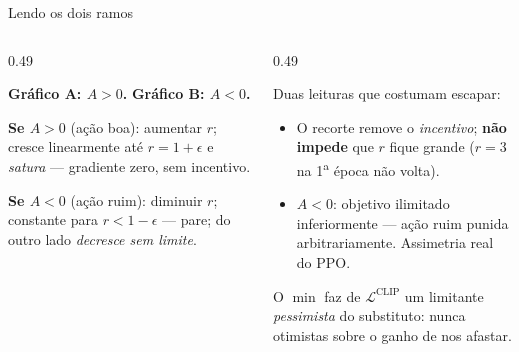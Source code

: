 \documentclass[aspectratio=169, 10pt]{beamer}
\newcommand{\Adv}{A}
\newcommand{\Lclip}{\mathcal{L}^{\mathrm{CLIP}}}
\begin{document}
\begin{frame}{Lendo os dois ramos}

  \begin{columns}[T]
  \begin{column}{0.49\textwidth}
    \begin{respbox}
      \textbf{Gráfico A: $\Adv>0$.} \; \textbf{Gráfico B: $\Adv<0$.}
    \end{respbox}
    \smallskip
    {\small
    \textbf{Se $\Adv>0$} (ação boa): aumentar $r$; cresce linearmente até
    $r = 1+\epsilon$ e \emph{satura} --- gradiente zero, sem incentivo.
    \par\smallskip
    \textbf{Se $\Adv<0$} (ação ruim): diminuir $r$; constante para
    $r < 1-\epsilon$ --- pare; do outro lado \emph{decresce sem limite}.}
  \end{column}
  \begin{column}{0.49\textwidth}
    \begin{alertabox}
      Duas leituras que costumam escapar:
      \begin{itemize}
        \item O recorte remove o \emph{incentivo}; \textbf{não impede} que $r$
          fique grande ($r=3$ na 1\textsuperscript{a} época não volta).
        \item $\Adv<0$: objetivo ilimitado inferiormente --- ação ruim punida
          arbitrariamente. Assimetria real do PPO.
      \end{itemize}
    \end{alertabox}
    \begin{ideiabox}
      O $\min$ faz de $\Lclip$ um limitante \emph{pessimista} do substituto: nunca
      otimistas sobre o ganho de nos afastar.
    \end{ideiabox}
  \end{column}
  \end{columns}
\end{frame}
\end{document}
